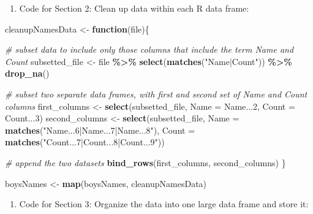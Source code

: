 \documentclass[
]{book}
\newenvironment{Shaded}{\begin{snugshade}}{\end{snugshade}}
\newcommand{\CommentTok}[1]{\textcolor[rgb]{0.56,0.35,0.01}{\textit{#1}}}
\newcommand{\ControlFlowTok}[1]{\textcolor[rgb]{0.13,0.29,0.53}{\textbf{#1}}}
\newcommand{\DataTypeTok}[1]{\textcolor[rgb]{0.13,0.29,0.53}{#1}}
\newcommand{\DecValTok}[1]{\textcolor[rgb]{0.00,0.00,0.81}{#1}}
\newcommand{\KeywordTok}[1]{\textcolor[rgb]{0.13,0.29,0.53}{\textbf{#1}}}
\newcommand{\NormalTok}[1]{#1}
\newcommand{\OperatorTok}[1]{\textcolor[rgb]{0.81,0.36,0.00}{\textbf{#1}}}
\newcommand{\StringTok}[1]{\textcolor[rgb]{0.31,0.60,0.02}{#1}}
\providecommand{\tightlist}{%
  \setlength{\itemsep}{0pt}\setlength{\parskip}{0pt}}
\begin{document}
\begin{enumerate}
\def\labelenumi{\arabic{enumi}.}
\setcounter{enumi}{1}
\tightlist
\item
  Code for Section 2: Clean up data within each R data frame:
\end{enumerate}

\begin{Shaded}
\begin{Highlighting}[]
\NormalTok{cleanupNamesData \textless{}{-}}\StringTok{ }\ControlFlowTok{function}\NormalTok{(file)\{}
  
  \CommentTok{\# subset data to include only those columns that include the term \textasciigrave{}Name\textasciigrave{} and \textasciigrave{}Count\textasciigrave{}}
\NormalTok{  subsetted\_file \textless{}{-}}\StringTok{ }\NormalTok{file }\OperatorTok{\%\textgreater{}\%}
\StringTok{    }\KeywordTok{select}\NormalTok{(}\KeywordTok{matches}\NormalTok{(}\StringTok{"Name|Count"}\NormalTok{)) }\OperatorTok{\%\textgreater{}\%}
\StringTok{    }\KeywordTok{drop\_na}\NormalTok{()}

  \CommentTok{\# subset two separate data frames, with first and second set of \textasciigrave{}Name\textasciigrave{} and \textasciigrave{}Count\textasciigrave{} columns }
\NormalTok{  first\_columns \textless{}{-}}\StringTok{ }\KeywordTok{select}\NormalTok{(subsetted\_file, }\DataTypeTok{Name =}\NormalTok{ Name...}\DecValTok{2}\NormalTok{, }\DataTypeTok{Count =}\NormalTok{ Count...}\DecValTok{3}\NormalTok{) }
\NormalTok{  second\_columns \textless{}{-}}\StringTok{ }\KeywordTok{select}\NormalTok{(subsetted\_file, }\DataTypeTok{Name =} \KeywordTok{matches}\NormalTok{(}\StringTok{"Name...6|Name...7|Name...8"}\NormalTok{),}
                                           \DataTypeTok{Count =} \KeywordTok{matches}\NormalTok{(}\StringTok{"Count...7|Count...8|Count...9"}\NormalTok{))}

  \CommentTok{\# append the two datasets}
  \KeywordTok{bind\_rows}\NormalTok{(first\_columns, second\_columns)}
\NormalTok{\}}

\NormalTok{boysNames \textless{}{-}}\StringTok{ }\KeywordTok{map}\NormalTok{(boysNames, cleanupNamesData)}
\end{Highlighting}
\end{Shaded}

\begin{enumerate}
\def\labelenumi{\arabic{enumi}.}
\setcounter{enumi}{2}
\tightlist
\item
  Code for Section 3: Organize the data into one large data frame and store it:
\end{enumerate}
\end{document}

